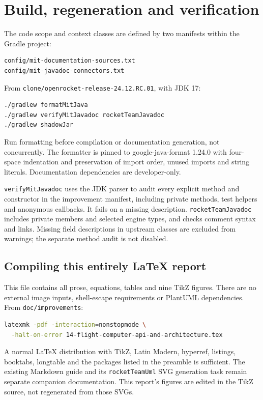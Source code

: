 \documentclass[10pt,letterpaper]{article}
\newcommand{\code}[1]{\nolinkurl{#1}}
\begin{document}
\clearpage
\section{Build, regeneration and verification}
The code scope and context classes are defined by two manifests within the
Gradle project:
\begin{lstlisting}
config/mit-documentation-sources.txt
config/mit-javadoc-connectors.txt
\end{lstlisting}
From \code{clone/openrocket-release-24.12.RC.01}, with JDK 17:
\begin{lstlisting}[language=bash]
./gradlew formatMitJava
./gradlew verifyMitJavadoc rocketTeamJavadoc
./gradlew shadowJar
\end{lstlisting}
Run formatting before compilation or documentation generation, not
concurrently. The formatter is pinned to google-java-format 1.24.0 with
four-space indentation and preservation of import order, unused imports and
string literals. Documentation dependencies are developer-only.

\code{verifyMitJavadoc} uses the JDK parser to audit every explicit method and
constructor in the improvement manifest, including private methods, test
helpers and anonymous callbacks. It fails on a missing description.
\code{rocketTeamJavadoc} includes private members and selected engine types,
and checks comment syntax and links. Missing field descriptions in upstream
classes are excluded from warnings; the separate method audit is not disabled.

\subsection{Compiling this entirely LaTeX report}
This file contains all prose, equations, tables and nine TikZ figures. There
are no external image inputs, shell-escape requirements or PlantUML dependencies.
From \code{doc/improvements}:
\begin{lstlisting}[language=bash]
latexmk -pdf -interaction=nonstopmode \
  -halt-on-error 14-flight-computer-api-and-architecture.tex
\end{lstlisting}
A normal LaTeX distribution with TikZ, Latin Modern, hyperref, listings,
booktabs, longtable and the packages listed in the preamble is sufficient.
The existing Markdown guide and its \code{rocketTeamUml} SVG generation task
remain separate companion documentation. This report's figures are edited
in the TikZ source, not regenerated from those SVGs.
\end{document}
